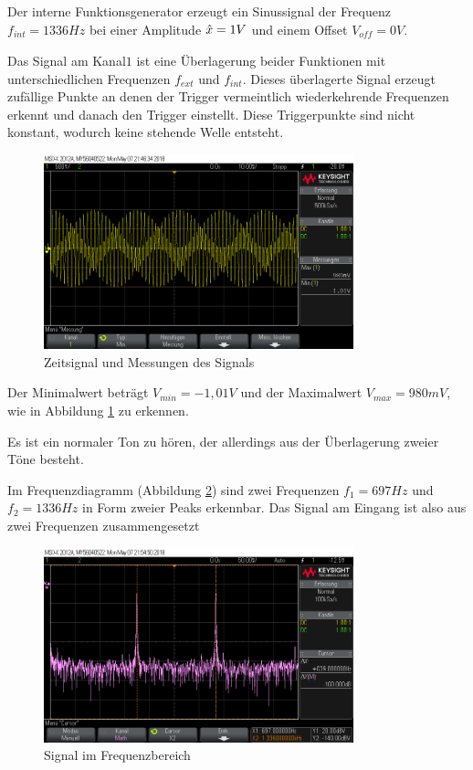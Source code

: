 \documentclass[a4paper]{article}
\begin{document}
Der interne Funktionsgenerator erzeugt ein Sinussignal der Frequenz $f_\textit{int}=1336\si{Hz}$ bei einer Amplitude $\Hat{x}=1V$ und einem Offset $V_\textit{off}=0V$.

Das Signal am Kanal$1$ ist eine Überlagerung beider Funktionen mit unterschiedlichen Frequenzen $f_\textit{ext}$ und $f_\textit{int}$. Dieses überlagerte Signal erzeugt zufällige Punkte an denen der Trigger vermeintlich wiederkehrende Frequenzen erkennt und danach den Trigger einstellt. Diese Triggerpunkte sind nicht konstant, wodurch keine stehende Welle entsteht.

\begin{figure}[H]
    \centering
    \includegraphics[width=0.8\textwidth]{aufgabe3_time.png}
    \caption{Zeitsignal und Messungen des Signals}
    \label{fig:aufgabe3-meas}
\end{figure}


Der Minimalwert beträgt $V_\textit{min}=-1,01\si{V}$ und der Maximalwert $V_\textit{max}=980\si{mV}$, wie in Abbildung \ref{fig:aufgabe3-meas} zu erkennen.

Es ist ein normaler Ton zu hören, der allerdings aus der Überlagerung zweier Töne besteht.

Im Frequenzdiagramm (Abbildung \ref{fig:aufgabe3-fft}) sind zwei Frequenzen $f_1=697\si{Hz}$ und $f_2=1336\si{Hz}$ in Form zweier Peaks erkennbar. Das Signal am Eingang ist also aus zwei Frequenzen zusammengesetzt

\begin{figure}[H]
    \centering
    \includegraphics[width=0.8\textwidth]{aufgabe3_fft_band.png}
    \caption{Signal im Frequenzbereich}
    \label{fig:aufgabe3-fft}
\end{figure}
\end{document}
